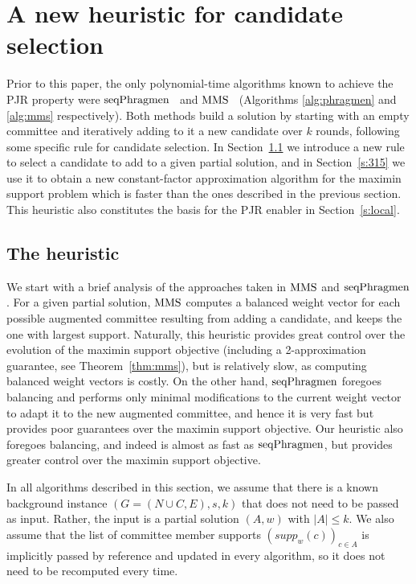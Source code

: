 \section{A new heuristic for candidate selection}\label{s:heuristic}

Prior to this paper, the only polynomial-time algorithms known to achieve the PJR property were $\operatorname{seqPhragmen}$~\cite{brill2017phragmen} and $\operatorname{MMS}$~\cite{sanchez2016maximin} (Algorithms \ref{alg:phragmen} and \ref{alg:mms} respectively). 
Both methods build a solution by starting with an empty committee and iteratively adding to it a new candidate over $k$ rounds, following some specific rule for candidate selection. 
In Section~\ref{ss:heuristic} we introduce a new rule to select a candidate to add to a given partial solution, and in Section~\ref{s:315} we use it to obtain a new constant-factor approximation algorithm for the maximin support problem which is faster than the ones described in the previous section. 
This heuristic also constitutes the basis for the PJR enabler in Section~\ref{s:local}.

\subsection{The heuristic}\label{ss:heuristic}

We start with a brief analysis of the approaches taken in $\operatorname{MMS}$ and $\operatorname{seqPhragmen}$. For a given partial solution, $\operatorname{MMS}$ computes a balanced weight vector for each possible augmented committee resulting from adding a candidate, and keeps the one with largest support. Naturally, this heuristic provides great control over the evolution of the maximin support objective (including a 2-approximation guarantee, see Theorem~\ref{thm:mms}), but is relatively slow, as computing balanced weight vectors is costly. On the other hand, $\operatorname{seqPhragmen}$ foregoes balancing and performs only minimal modifications to the current weight vector to adapt it to the new augmented committee, and hence it is very fast but provides poor guarantees over the maximin support objective. Our heuristic also foregoes balancing, and indeed is almost as fast as $\operatorname{seqPhragmen}$, but provides greater control over the maximin support objective.

In all algorithms described in this section, we assume that there is a known background instance $(G=(N\cup C, E), s, k)$ that does not need to be passed as input. Rather, the input is a partial solution $(A,w)$ with $|A|\leq k$. We also assume that the list of committee member supports $(supp_w(c))_{c\in A}$ is implicitly passed by reference and updated in every algorithm, so it does not need to be recomputed every time.

